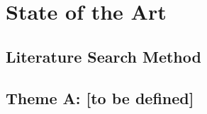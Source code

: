 %
%
%

\section{State of the Art}
\label{sec:state-of-the-art}


\subsection{Literature Search Method}
\label{sec:sota-method}

\subsection{Theme A: [to be defined]}
\label{sec:sota-theme-a}

